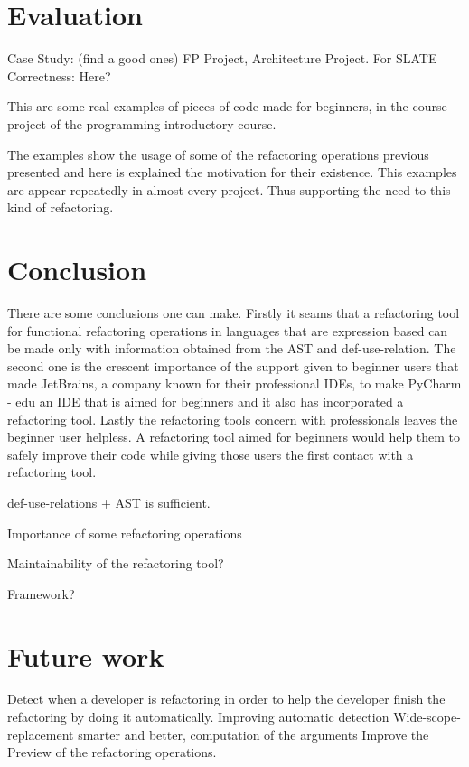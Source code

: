\section{Evaluation}
Case Study: (find a good ones) FP Project, Architecture Project. For SLATE
Correctness: Here?


This are some real examples of pieces of code made for beginners, in the course
project of the programming introductory course.


The examples show the usage of some of the refactoring operations previous presented
and here is explained the motivation for their existence.
This examples are appear repeatedly in almost every project. Thus supporting
the need to this kind of refactoring.


\section{Conclusion}

There are some conclusions one can make. Firstly it seams that a refactoring
tool for functional refactoring operations in languages that are expression based
can be made only with information obtained from the AST and def-use-relation.
The second one is the crescent importance of the support given to beginner users
that made JetBrains, a company known for their professional IDEs, to make PyCharm - edu
 an IDE that is aimed for beginners and it also has incorporated a refactoring tool.
 Lastly the refactoring tools concern with professionals leaves the beginner
 user helpless.
 A refactoring tool aimed for beginners would help them to safely improve
 their code while giving those users the first contact with a refactoring tool.


def-use-relations + AST is sufficient.

Importance of some refactoring operations

Maintainability of the refactoring tool?

Framework?
\section{Future work}
Detect when a developer is refactoring in order to help the developer finish the
refactoring by doing it automatically.
Improving automatic detection
Wide-scope-replacement smarter and better, computation of the arguments
Improve the Preview of the refactoring operations.
